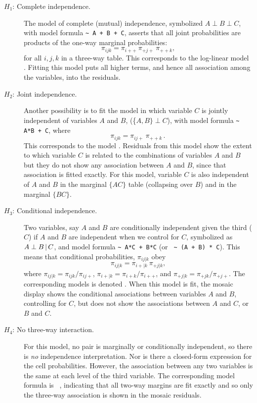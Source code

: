 \documentclass[10pt,krantz2]{krantz}\usepackage[]{graphicx}\usepackage[]{color}
\begin{document}
\begin{description}
\item[$H_1$: Complete independence.]  The model of complete (mutual) independence, symbolized $A \perp B \perp C$, with model formula \verb|~ A + B + C|,
       asserts that all joint probabilities are products of the
       one-way marginal probabilities:
\begin{equation*}
 \pi_{ijk} = \pi_{i++} \: \pi_{+j+} \: \pi_{++k}
 \comma
\end{equation*}
for all \(i , j , k\) in a
       three-way table.  This corresponds to the log-linear model
       .  Fitting this model puts all higher
       terms, and hence all association among the variables, into the
       residuals.

\item[$H_2$: Joint independence.]  Another possibility is to fit the model in
       which variable \(C\) is jointly independent of variables \(A\)
       and \(B\), (\{$A , B \} \perp C $), with model formula \verb|~ A*B + C|,
       where
\begin{equation*}
 \pi_{ijk}  =  \pi_{ij+} \:  \pi_{++k} \period
\end{equation*}
This corresponds to the \loglin model .
Residuals from this model show the extent to which
variable \(C\) is related to the combinations of variables
\(A\) and \(B\) but they do not show any association between
\(A\) and \(B\), since that association is fitted exactly.
For this model, variable $C$ is also independent of $A$ and
$B$ in the marginal $\{AC\}$ table (collapsing over $B$) and
in the marginal $\{BC\}$.

\item[$H_3$: Conditional independence.] Two variables, say $A$ and $B$ are conditionally independent
given the third ($C$) if $A$ and $B$ are independent when we
control for $C$, symbolized as $A \perp B \, | \, C$, and model formula 
\verb|~ A*C + B*C| (or \verb| ~ (A + B) * C|).
This means that conditional probabilities, $\pi_{ij|k}$ obey
\begin{equation*}
 \pi_{ij|k}  =  \pi_{i+|k} \:  \pi_{+j|k} \comma
\end{equation*}
where
$\pi_{ij|k} = \pi_{ijk} / \pi_{ij+}$,
$\pi_{i+|k} = \pi_{i+k} / \pi_{i++}$, and
$\pi_{+j|k} = \pi_{+jk} / \pi_{+j+}$.
The corresponding \loglin{} models is denoted .
When this model is fit, the mosaic display shows the conditional
associations between variables $A$ and $B$, controlling for $C$,
but does not show the associations between $A$ and $C$, or
$B$ and $C$.

\item[$H_4$: No three-way interaction.]  For this model, no pair is
marginally or
conditionally independent, so there is \emph{no} independence interpretation.
Nor is there a closed-form expression for the cell probabilities.
However, the association between any two
variables is the same at each level of the third variable.
The corresponding \loglin model formula is ~,
indicating that all two-way margins are fit exactly and so
only the three-way association is
shown in the mosaic residuals.
\end{description}
\end{document}
